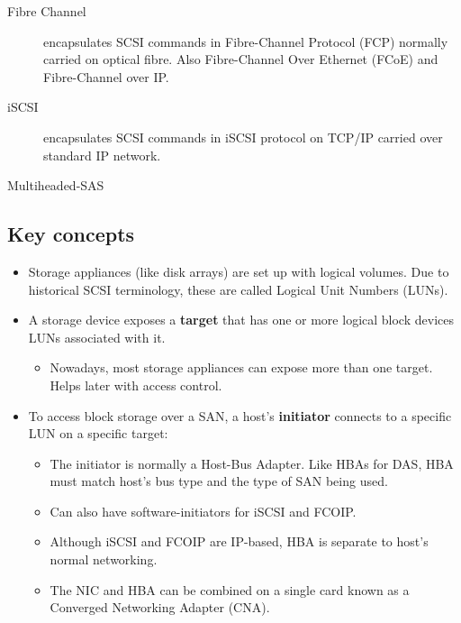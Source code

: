 \begin{description}
\item[Fibre Channel]
encapsulates SCSI commands in Fibre-Channel Protocol (FCP) normally
carried on optical fibre. Also Fibre-Channel Over Ethernet (FCoE) and
Fibre-Channel over IP.
\item[iSCSI]
encapsulates SCSI commands in iSCSI protocol on TCP/IP carried over
standard IP network.
\item[Multiheaded-SAS]
\end{description}

\subsection{Key concepts}\label{key-concepts}

\begin{itemize}
\item
  Storage appliances (like disk arrays) are set up with logical volumes.
  Due to historical SCSI terminology, these are called Logical Unit
  Numbers (LUNs).
\item
  A storage device exposes a \textbf{target} that has one or more
  logical block devices LUNs associated with it.

  \begin{itemize}
  
  \item
    Nowadays, most storage appliances can expose more than one target.
    Helps later with access control.
  \end{itemize}
\item
  To access block storage over a SAN, a host's \textbf{initiator}
  connects to a specific LUN on a specific target:

  \begin{itemize}
  \item
    The initiator is normally a Host-Bus Adapter. Like HBAs for DAS, HBA
    must match host's bus type and the type of SAN being used.
  \item
    Can also have software-initiators for iSCSI and FCOIP.
  \item
    Although iSCSI and FCOIP are IP-based, HBA is separate to host's
    normal networking.
  \item
    The NIC and HBA can be combined on a single card known as a
    Converged Networking Adapter (CNA).
  \end{itemize}
\end{itemize}

